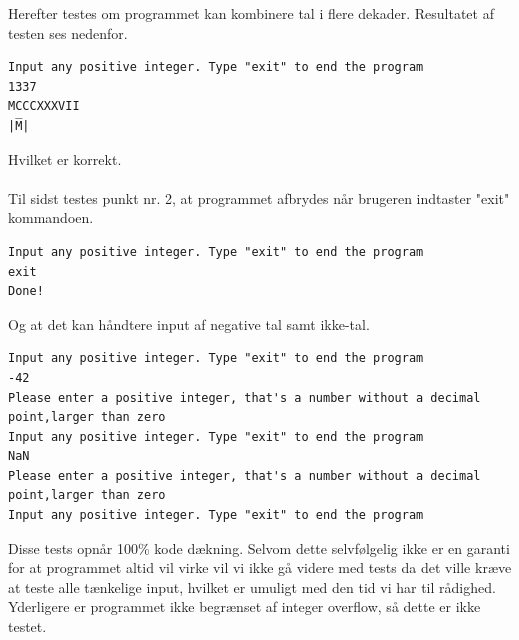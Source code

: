 	Herefter testes om programmet kan kombinere tal i flere dekader. Resultatet af testen ses nedenfor.
	\begin{lstlisting}[caption=Test af dekadekombination]
Input any positive integer. Type "exit" to end the program
1337
MCCCXXXVII
|M̅|
	\end{lstlisting}
	Hvilket er korrekt. \\
	\\
	Til sidst testes punkt nr. 2, at programmet afbrydes når brugeren indtaster "exit" kommandoen.
	\begin{lstlisting}[caption=Test af exit kommando]
Input any positive integer. Type "exit" to end the program
exit
Done!
	\end{lstlisting}
	Og at det kan håndtere input af negative tal samt ikke-tal.
	\begin{lstlisting}[caption=Test af dårligt input]
Input any positive integer. Type "exit" to end the program
-42
Please enter a positive integer, that's a number without a decimal point,larger than zero
Input any positive integer. Type "exit" to end the program
NaN
Please enter a positive integer, that's a number without a decimal point,larger than zero
Input any positive integer. Type "exit" to end the program
	\end{lstlisting}
	
	Disse tests opnår 100\% kode dækning. Selvom dette selvfølgelig ikke er en garanti for at programmet altid vil virke vil vi ikke gå videre med tests da det ville kræve at teste alle tænkelige input, hvilket er umuligt med den tid vi har til rådighed. Yderligere er programmet ikke begrænset af integer overflow, så dette er ikke testet.